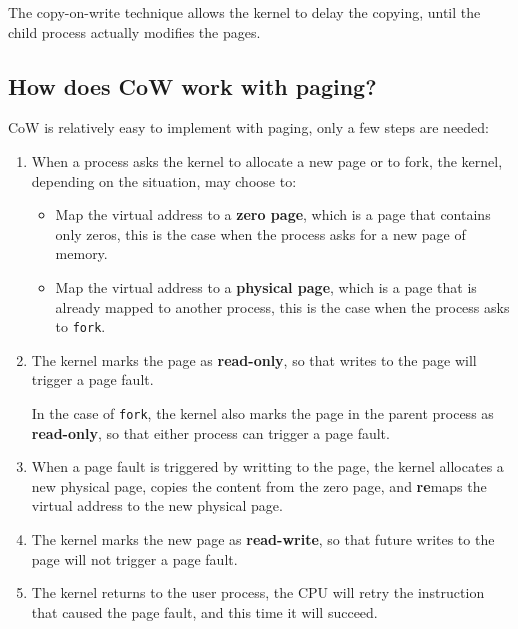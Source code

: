 The copy-on-write technique allows the kernel to delay the copying,
until the child process actually modifies the pages.


\subsection{How does CoW work with paging?}

CoW is relatively easy to implement with paging, only a few steps are needed:

\begin{enumerate}
    \item When a process asks the kernel to allocate a new page or to fork, the kernel,
          depending on the situation, may choose to:
          \begin{itemize}
              \item Map the virtual address to a \textbf{zero page}, which is a
                    page that contains only zeros, this is the case when the
                    process asks for a new page of memory.
              \item Map the virtual address to a \textbf{physical page}, which is
                    a page that is already mapped to another process, this is the
                    case when the process asks to \texttt{fork}.
          \end{itemize}
    \item The kernel marks the page as \textbf{read-only}, so that
          writes to the page will trigger a page fault.

          In the case of \texttt{fork}, the kernel also marks the page in
          the parent process as \textbf{read-only}, so that either process
          can trigger a page fault.

    \item When a page fault is triggered by writting to the page, the
          kernel allocates a new physical page, copies the content from the
          zero page, and \textbf{re}maps the virtual address to the new physical page.
    \item The kernel marks the new page as \textbf{read-write}, so that
          future writes to the page will not trigger a page fault.
    \item The kernel returns to the user process, the CPU will retry
          the instruction that caused the page fault, and this time it will
          succeed.
\end{enumerate}

